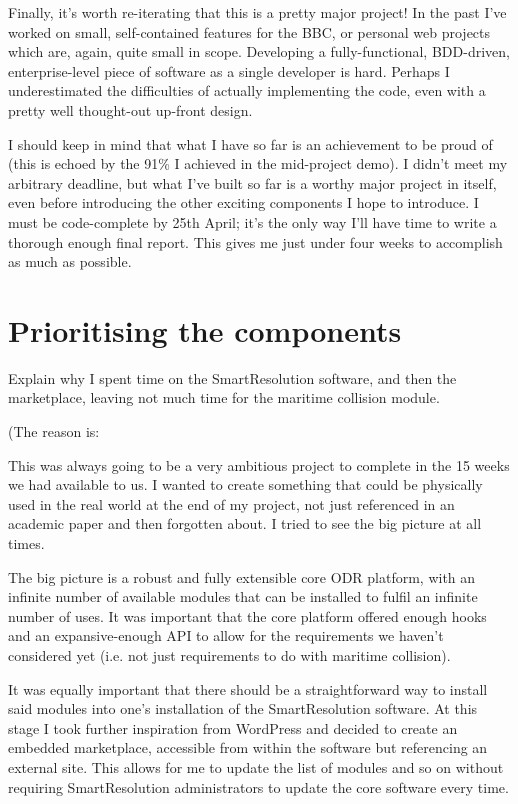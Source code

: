 Finally, it's worth re-iterating that this is a pretty major project! In the past I've worked on small, self-contained features for the BBC, or personal web projects which are, again, quite small in scope. Developing a fully-functional, BDD-driven, enterprise-level piece of software as a single developer is hard. Perhaps I underestimated the difficulties of actually implementing the code, even with a pretty well thought-out up-front design.

I should keep in mind that what I have so far is an achievement to be proud of (this is echoed by the 91\% I achieved in the mid-project demo). I didn't meet my arbitrary deadline, but what I've built so far is a worthy major project in itself, even before introducing the other exciting components I hope to introduce. I must be code-complete by 25th April; it's the only way I'll have time to write a thorough enough final report. This gives me just under four weeks to accomplish as much as possible.

\section{Prioritising the components}

Explain why I spent time on the SmartResolution software, and then the marketplace, leaving not much time for the maritime collision module.

(The reason is:

This was always going to be a very ambitious project to complete in the 15 weeks we had available to us. I wanted to create something that could be physically used in the real world at the end of my project, not just referenced in an academic paper and then forgotten about. I tried to see the big picture at all times.

The big picture is a robust and fully extensible core ODR platform, with an infinite number of available modules that can be installed to fulfil an infinite number of uses. It was important that the core platform offered enough hooks and an expansive-enough API to allow for the requirements we haven't considered yet (i.e. not just requirements to do with maritime collision).

It was equally important that there should be a straightforward way to install said modules into one's installation of the SmartResolution software. At this stage I took further inspiration from WordPress and decided to create an embedded marketplace, accessible from within the software but referencing an external site. This allows for me to update the list of modules and so on without requiring SmartResolution administrators to update the core software every time.

